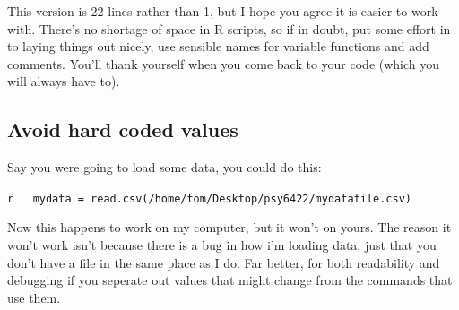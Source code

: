 \documentclass[]{book}
\newenvironment{Shaded}{\begin{snugshade}}{\end{snugshade}}
\newcommand{\KeywordTok}[1]{\textcolor[rgb]{0.13,0.29,0.53}{\textbf{#1}}}
\newcommand{\DecValTok}[1]{\textcolor[rgb]{0.00,0.00,0.81}{#1}}
\newcommand{\StringTok}[1]{\textcolor[rgb]{0.31,0.60,0.02}{#1}}
\newcommand{\CommentTok}[1]{\textcolor[rgb]{0.56,0.35,0.01}{\textit{#1}}}
\newcommand{\OtherTok}[1]{\textcolor[rgb]{0.56,0.35,0.01}{#1}}
\newcommand{\ControlFlowTok}[1]{\textcolor[rgb]{0.13,0.29,0.53}{\textbf{#1}}}
\newcommand{\OperatorTok}[1]{\textcolor[rgb]{0.81,0.36,0.00}{\textbf{#1}}}
\newcommand{\NormalTok}[1]{#1}
\begin{document}
\begin{Shaded}
\end{Shaded}

This version is 22 lines rather than 1, but I hope you agree it is
easier to work with. There's no shortage of space in R scripts, so if in
doubt, put some effort in to laying things out nicely, use sensible
names for variable functions and add comments. You'll thank yourself
when you come back to your code (which you will always have to).

\subsection{Avoid hard coded values}\label{avoid-hard-coded-values}

Say you were going to load some data, you could do this:

\texttt{r\ \ \ mydata\ =\ read.csv(\textquotesingle{}/home/tom/Desktop/psy6422/mydatafile.csv\textquotesingle{})}

Now this happens to work on my computer, but it won't on yours. The
reason it won't work isn't because there is a bug in how i'm loading
data, just that you don't have a file in the same place as I do. Far
better, for both readability and debugging if you seperate out values
that might change from the commands that use them.
\end{document}
